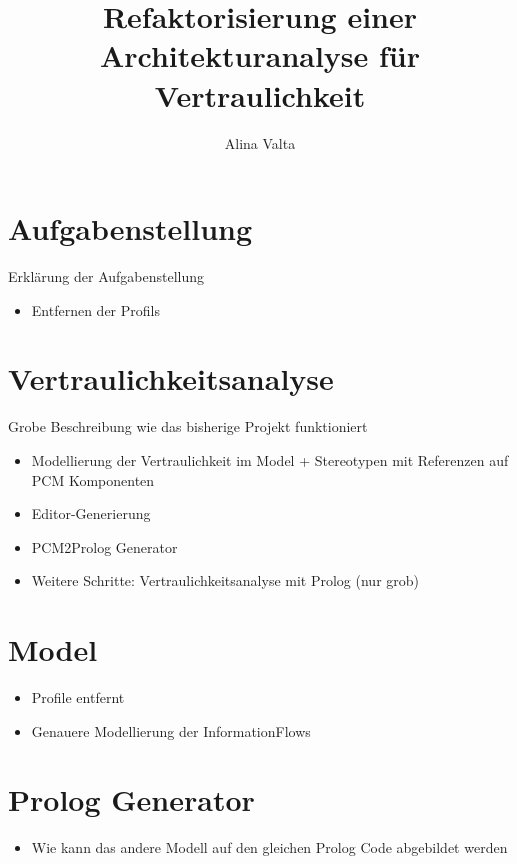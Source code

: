 \documentclass[twoside, ngerman]{sdqseminar}
\author{Alina Valta}
\title{Refaktorisierung einer Architekturanalyse für Vertraulichkeit}
\begin{document}
\setpdf

\maketitle

 

\begin{abstract}
%
\end{abstract}



%
%
%


\section{Aufgabenstellung}
Erklärung der Aufgabenstellung
\begin{itemize}
	\item Entfernen der Profils 
\end{itemize}

\section{Vertraulichkeitsanalyse}
Grobe Beschreibung wie das bisherige Projekt funktioniert 
\begin{itemize}
	\item Modellierung der Vertraulichkeit im Model + Stereotypen mit Referenzen auf PCM Komponenten
	\item Editor-Generierung
	\item PCM2Prolog Generator
	\item Weitere Schritte: Vertraulichkeitsanalyse mit Prolog (nur grob)
\end{itemize}

\section{Model}
\begin{itemize}
	\item Profile entfernt
	\item Genauere Modellierung der InformationFlows
\end{itemize}

\section{Prolog Generator}
\begin{itemize}
	\item Wie kann das andere Modell auf den gleichen Prolog Code abgebildet werden
\end{itemize}


\printbibliography[heading=bibintoc]
\end{document}
